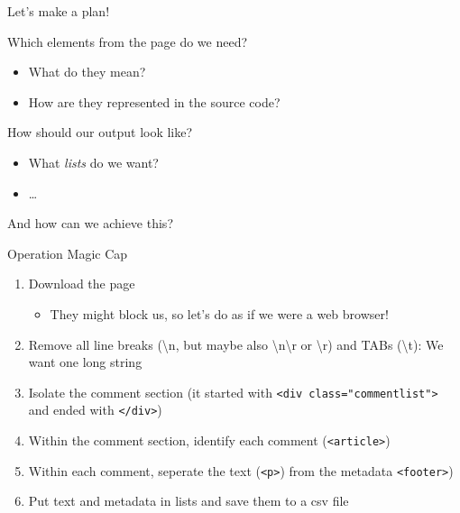 \documentclass{beamer}
\begin{document}
{\begin{frame}[plain]
\end{frame}
}


\begin{frame}{Let's make a plan!}
\begin{block}{Which elements from the page do we need?}
\begin{itemize}
\item What do they mean?
\item How are they represented in the source code?
\end{itemize}
\end{block}
\begin{block}{How should our output look like?}
\begin{itemize}
\item What \emph{lists} do we want?
\item \ldots
\end{itemize}
\end{block}
And how can we achieve this?
\end{frame}


\begin{frame}{}
\begin{block}{Operation Magic Cap}
\begin{enumerate}
\item<2-> Download the page
   \begin{itemize}
   \item<3-> They might block us, so let's do as if we were a web browser!
   \end{itemize}
\item<4-> Remove all line breaks (\textbackslash n, but maybe also \textbackslash n\textbackslash r or \textbackslash r) and TABs (\textbackslash t): We want one long string
\item<5-> Isolate the comment section (it started with {\tt{<div class="commentlist">}} and ended with {\tt{</div>}})
\item<6-> Within the comment section, identify each comment ({\tt{<article>}})
\item<7-> Within each comment, seperate the text ({\tt{<p>}}) from the metadata {\tt{<footer>}})
\item<8-> Put text and metadata in lists and save them to a csv file
\end{enumerate}
\end{block}
\end{frame}
\end{document}
